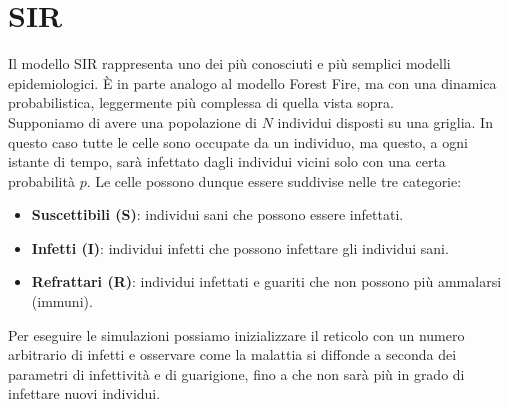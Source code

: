 \documentclass{article}
\begin{document}
    \section{SIR}
    Il modello SIR rappresenta uno dei più conosciuti e più semplici modelli epidemiologici.
    È in parte analogo al modello Forest Fire, ma con una dinamica probabilistica, leggermente più complessa di quella vista sopra.\\
    Supponiamo di avere una popolazione di $N$ individui disposti su una griglia. In questo caso tutte le celle sono
    occupate da un individuo, ma questo, a ogni istante di tempo, sarà infettato dagli individui vicini solo con una certa probabilità $p$.
    Le celle possono dunque essere suddivise nelle tre categorie:
    \begin{itemize}
        \item \textbf{Suscettibili (S)}: individui sani che possono essere infettati.
        \item \textbf{Infetti (I)}: individui infetti che possono infettare gli individui sani.
        \item \textbf{Refrattari (R)}: individui infettati e guariti che non possono più ammalarsi (immuni).
    \end{itemize}
    Per eseguire le simulazioni possiamo inizializzare il reticolo con un numero arbitrario di infetti e osservare come la malattia si diffonde a
    seconda dei parametri di infettività e di guarigione, fino a che non sarà più in grado di infettare nuovi individui.
\end{document}
